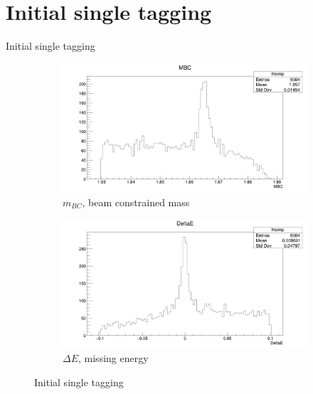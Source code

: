 \documentclass{beamer}
\begin{document}
\section{Initial single tagging}
\begin{frame}{Initial single tagging}
  \begin{figure}
    \centering
    \begin{subfigure}{0.5\textwidth}
      \centering
      \includegraphics[width=\textwidth]{MBC.png}
      \caption{$m_{BC}$, beam constrained mass}
    \end{subfigure}%
    \begin{subfigure}{0.5\textwidth}
      \centering
      \includegraphics[width=\textwidth]{DeltaE.png}
      \caption{$\Delta E$, missing energy}
    \end{subfigure}
    \caption{Initial single tagging}
  \end{figure}
\end{frame}
\end{document}
